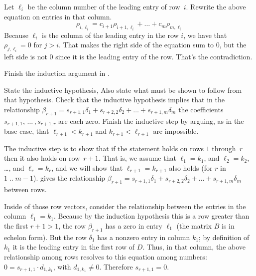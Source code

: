 \begin{exercises}
\begin{answer}
\begin{exparts}
          Let $\ell_{i}$ be the column number of the leading entry of
          row~$i$. 
          Rewrite the above equation on entries in that column.
          \begin{equation*}
             \rho_{i,\ell_{i}}=c_{i+1}\rho_{i+1,\ell_{i}}
                             +\dots+c_m\rho_{m,\ell_{i}}
          \end{equation*}
          Because $\ell_{i}$ is the column of the leading entry in the
          row $i$, we have that $\rho_{j,\ell_{i}}=0$ for $j>i$.
          That makes the right side of the equation sum to $0$, but the
          left side is not $0$ since it is the leading entry of the row. 
          That's the contradiction. 
      \end{exparts}  
    \end{answer}
  \item \label{ex:RowEqEchFormAreSameShape}
    Finish the induction argument in .
    \begin{exparts}
      \partsitem State the inductive hypothesis, 
         Also state what must be shown to follow from that hypothesis.
      \partsitem Check that the inductive hypothesis implies that
         in the relationship 
         $\beta_{r+1}=s_{r+1,1}\delta_1+s_{r+2,2}\delta_2
             +\dots+s_{r+1,m}\delta_m$ 
         the coefficients $s_{r+1,1},\,\ldots\,,s_{r+1,r}$
         are each zero.
      \partsitem Finish the inductive step by arguing, as in the base
         case, that $\ell_{r+1}<k_{r+1}$ and $k_{r+1}<\ell_{r+1}$
         are impossible.
    \end{exparts}
    \begin{answer}
      \begin{exparts}
        \partsitem The inductive step is to show that if 
          the statement holds on rows $1$ through~$r$ then it also holds on 
          row~$r+1$.       
          That is, we assume that $\ell_1=k_1$, and
          $\ell_2=k_2$, \ldots, and $\ell_r=k_r$, 
          and we will show that $\ell_{r+1}=k_{r+1}$ also holds
          (for $r$ in $1\;..\;m-1$).
        \partsitem
           gives the
          relationship  
          $\beta_{r+1}=s_{r+1,1}\delta_1+s_{r+2,2}\delta_2
             +\dots+s_{r+1,m}\delta_m$ 
          between rows.

          Inside of those row vectors, consider the relationship between
          the entries in the column $\ell_1=k_1$.
          Because by the induction hypothesis this is a row greater than the 
          first $r+1>1$, the row $\beta_{r+1}$ has a zero in entry $\ell_1$
          (the matrix $B$ is in echelon form). 
          But the row $\delta_1$
          has a nonzero entry in column $k_1$; by definition of 
          $k_1$ it is the leading entry in the first row of $D$.
          Thus, in that column, the above relationship among rows resolves
          to this equation among numbers: $0=s_{r+1,1}\cdot d_{1,k_1}$,
          with $d_{1,k_1}\neq 0$.
          Therefore $s_{r+1,1}=0$.


\end{exparts}
\end{answer}
\end{exercises}
